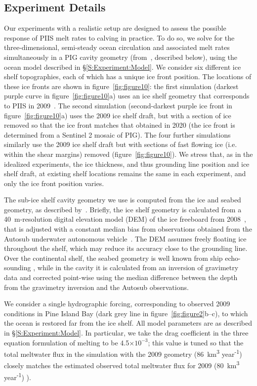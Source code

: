 \documentclass[draft]{agujournal2019}
\begin{document}
\subsection{Experiment Details}
Our experiments with a realistic setup are designed to assess the possible response of PIIS melt rates to calving in practice. To do so, we solve for the three-dimensional, semi-steady ocean circulation and associated melt rates simultaneously in a PIG cavity geometry (from~, described below), using the ocean model described in \S\ref{S:Experiment:Model}. We consider six different ice shelf topographies, each of which has a unique ice front position. The locations of these ice fronts are shown in figure~\ref{fig:figure10}: the first simulation (darkest purple curve in figure~\ref{fig:figure10}a) uses an ice shelf geometry that corresponds to PIIS in 2009~\cite{Dutrieux2014Science}. The second simulation (second-darkest purple ice front in figure~\ref{fig:figure10}a) uses the 2009 ice shelf draft, but with a section of ice removed so that the ice front matches that obtained in 2020 (the ice front is determined from a Sentinel 2 mosaic of PIG). The four further simulations similarly use the 2009 ice shelf draft but with sections of fast flowing ice (i.e. within the shear margins) removed (figure~\ref{fig:figure10}). We stress that, as in the idealized experiments, the ice thickness, and thus grounding line position and ice shelf draft, at existing shelf locations remains the same in each experiment, and only the ice front position varies. 

The sub-ice shelf cavity geometry we use is computed from the ice and seabed geometry, as described by~. Briefly, the ice shelf geometry is calculated from a 40~m-resolution digital elevation model (DEM) of the ice freeboard from 2008~\cite{Korona2009Photogrammetry}, that is adjusted with a constant median bias from observations obtained from the Autosub underwater autonomous vehicle~\cite{Jenkins2010NatureGeo}. The DEM assumes freely floating ice throughout the shelf, which may reduce its accuracy close to the grounding line. Over the continental shelf, the seabed geometry is well known from ship echo-sounding \cite{Dutrieux2014Science}, while in the cavity it is calculated from an inversion of gravimetry data and corrected point-wise using the median difference between the depth from the gravimetry inversion and the Autosub observations. 

We consider a single hydrographic forcing, corresponding to observed 2009 conditions in Pine Island Bay (dark grey line in figure~\ref{fig:figure2}b--c), to which the ocean is restored far from the ice shelf. All model parameters are as described in \S\ref{S:Experiment:Model}. In particular, we take the drag coefficient in the three equation formulation of melting to be 4.5$\times10^{-3}$; this value is tuned so that the total meltwater flux in the simulation with the 2009 geometry (86~km\textsuperscript{3} year\textsuperscript{-1}) closely matches the estimated observed total meltwater flux for 2009 (80~km\textsuperscript{3} year\textsuperscript{-1}) \cite{Dutrieux2014Science}).
\end{document}
